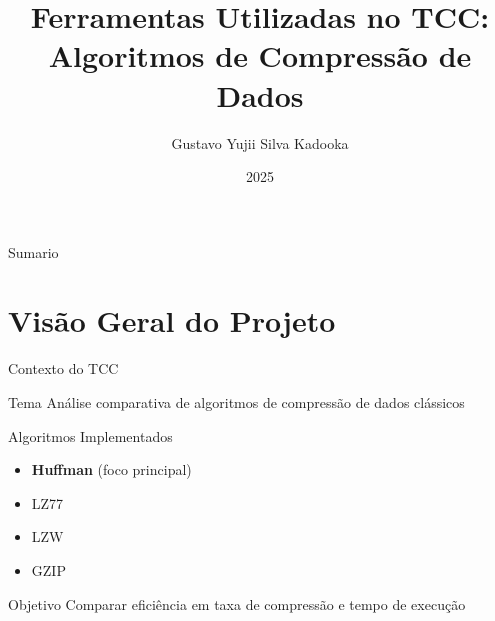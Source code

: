 \documentclass{beamer}
\title[Ferramentas do TCC]{Ferramentas Utilizadas no TCC:\\Algoritmos de Compressão de Dados}
\author[Gustavo Kadooka]{Gustavo Yujii Silva Kadooka}
\institute[UNESP]{Universidade Estadual Paulista - Campus Bauru}
\date{2025}
\begin{document}
\begin{frame}
    \titlepage
\end{frame}

\begin{frame}{Sumario}
    \tableofcontents
\end{frame}

\section{Visão Geral do Projeto}
\begin{frame}{Contexto do TCC}
    \begin{block}{Tema}
        Análise comparativa de algoritmos de compressão de dados clássicos
    \end{block}
    \begin{block}{Algoritmos Implementados}
        \begin{itemize}
            \item \textbf{Huffman} (foco principal)
            \item LZ77
            \item LZW
            \item GZIP
        \end{itemize}
    \end{block}
    \begin{block}{Objetivo}
        Comparar eficiência em taxa de compressão e tempo de execução
    \end{block}
\end{frame}
\end{document}
